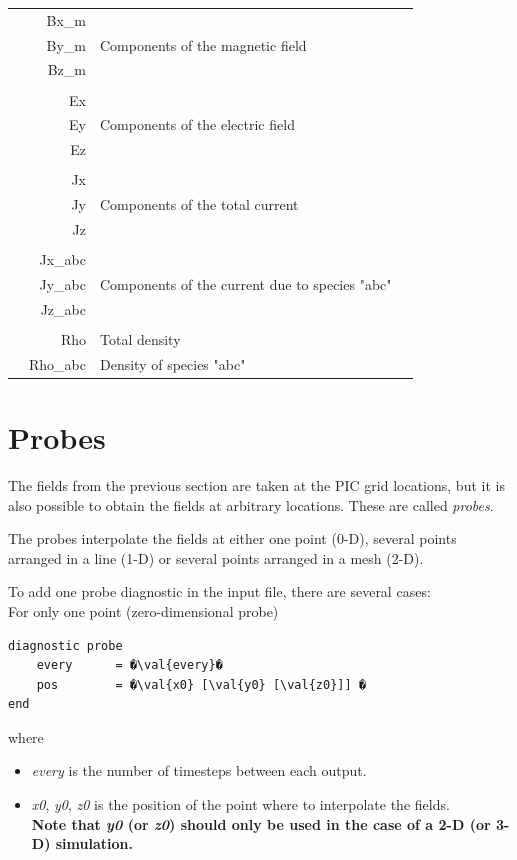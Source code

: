 \documentclass[11pt]{article}
\newcommand{\val}[1]{{\ttfamily \textit{#1}}}
\begin{document}
\begin{tabularx}{\textwidth}{X r | l X}
& Bx\_m &  & \\
& By\_m &  Components of the magnetic field & \\
& Bz\_m &  & \\
& & & \\
& Ex &  & \\
& Ey & Components of the electric field & \\
& Ez &  & \\
& & & \\
& Jx &  & \\
& Jy & Components of the total current & \\
& Jz &  & \\
& & & \\
& Jx\_abc &  & \\
& Jy\_abc & Components of the current due to species "abc" & \\
& Jz\_abc &  & \\
& & & \\
& Rho & Total density & \\
& Rho\_abc & Density of species "abc" & \\
\end{tabularx}

\clearpage


\section{Probes\label{sec:probes}}

The fields from the previous section are taken at the PIC grid locations, but it is also possible to obtain
the fields at arbitrary locations. These are called \textit{probes}.

The probes interpolate the fields at either one point (0-D), several points arranged in a line (1-D) or several points arranged in a mesh (2-D).

To add one probe diagnostic in the input file, there are several cases:\\
For only one point (zero-dimensional probe)
\begin{lstlisting}
diagnostic probe
    every      = �\val{every}�
    pos        = �\val{x0} [\val{y0} [\val{z0}]] �
end
\end{lstlisting}
where
\begin{itemize}
\item \val{every} is the number of timesteps between each output.
\item \val{x0}, \val{y0}, \val{z0} is the position of the point where to interpolate the fields.\\
\textbf{Note that \val{y0} (or \val{z0}) should only be used in the case of a 2-D (or 3-D) simulation.}
\end{itemize}
\end{document}

